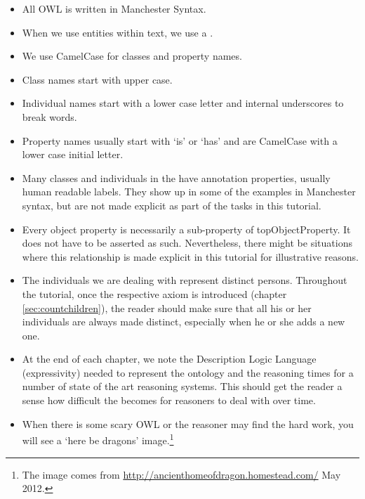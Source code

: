 \begin{itemize}
\item All OWL is written in Manchester Syntax.
\item When we use \fhkb entities within text, we use a .
\item We use CamelCase for classes and property names.
\item Class names start with upper case.
\item Individual names start with a lower case letter and internal underscores to break words.
\item Property names usually start with `is' or `has' and are CamelCase with a lower case initial letter.
\item Many classes and individuals in the \fhkb have annotation properties, usually human readable labels. They show up in some of the examples in Manchester syntax, but are not made explicit as part of the tasks in this tutorial.
\item Every object property is necessarily a sub-property of topObjectProperty. It does not have to be asserted as such. Nevertheless, there might be situations where this relationship is made explicit in this tutorial for illustrative reasons.
\item The individuals we are dealing with represent distinct persons. Throughout the tutorial, once the respective axiom is introduced (chapter \ref{sec:countchildren}), the reader should make sure that all his or her individuals are always made distinct, especially when he or she adds a new one.
\item At the end of each chapter, we note the Description Logic Language (expressivity) needed to represent the ontology and the reasoning times for a number of state of the art reasoning systems. This should get the reader a sense how difficult the \fhkb becomes for reasoners to deal with over time.
\item When there is some scary OWL or the reasoner may find the \fhkb hard work, you will see a `here be dragons' image\herebedragons.\footnote{The image comes from \url{http://ancienthomeofdragon.homestead.com/} May 2012.}
\end{itemize}
